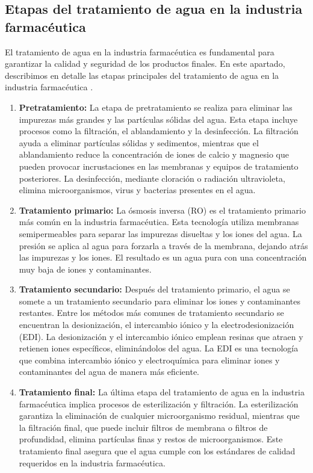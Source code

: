 \subsection{Etapas del tratamiento de agua en la industria farmacéutica}

El tratamiento de agua en la industria farmacéutica es fundamental para garantizar 
la calidad y seguridad de los productos finales. En este apartado, describimos en detalle 
las etapas principales del tratamiento de agua en la industria farmacéutica \cite{setaphtTratamientosAguaPara}.

\begin{enumerate}
    \item \textbf{Pretratamiento:}  La etapa de pretratamiento se realiza para eliminar las impurezas más grandes y las partículas sólidas del agua.
          Esta etapa incluye procesos como la filtración, el ablandamiento y la desinfección. La filtración ayuda a eliminar partículas sólidas y
          sedimentos, mientras que el ablandamiento reduce la concentración de iones de calcio y magnesio que pueden provocar incrustaciones en las
          membranas y equipos de tratamiento posteriores. La desinfección, mediante cloración o radiación ultravioleta, elimina microorganismos,
          virus y bacterias presentes en el agua.

    \item \textbf{Tratamiento primario:}  La ósmosis inversa (RO) es el tratamiento primario más común en la industria farmacéutica. Esta tecnología
          utiliza membranas semipermeables para separar las impurezas disueltas y los iones del agua. La presión se aplica al agua para forzarla
          a través de la membrana, dejando atrás las impurezas y los iones. El resultado es un agua pura con una concentración muy baja de
          iones y contaminantes.

    \item \textbf{Tratamiento secundario:} Después del tratamiento primario, el agua se somete a un tratamiento secundario para eliminar los
          iones y contaminantes restantes. Entre los métodos más comunes de tratamiento secundario se encuentran la desionización, el
          intercambio iónico y la electrodesionización (EDI). La desionización y el intercambio iónico emplean resinas que atraen y
          retienen iones específicos, eliminándolos del agua. La EDI es una tecnología que combina intercambio iónico y electroquímica
          para eliminar iones y contaminantes del agua de manera más eficiente.

    \item \textbf{Tratamiento final:} La última etapa del tratamiento de agua en la industria farmacéutica implica procesos de esterilización y filtración.
          La esterilización garantiza la eliminación de cualquier microorganismo residual, mientras que la filtración final, que puede incluir
          filtros de membrana o filtros de profundidad, elimina partículas finas y restos de microorganismos. Este tratamiento final asegura que
          el agua cumple con los estándares de calidad requeridos en la industria farmacéutica.

\end{enumerate}





